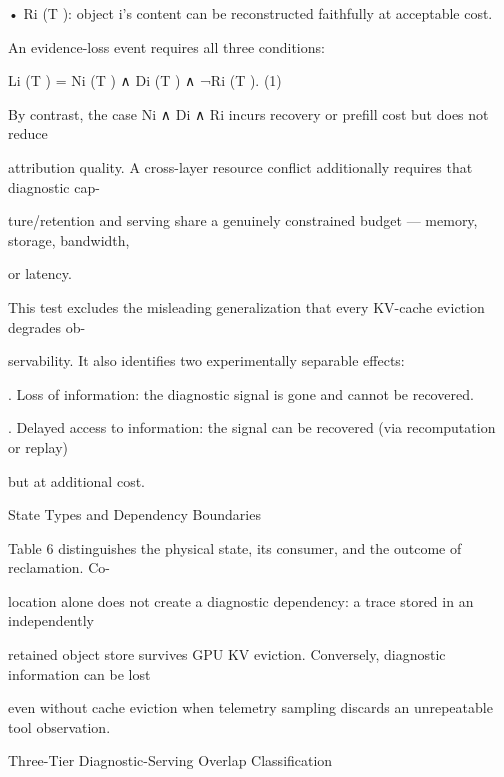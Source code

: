 \begin{flushleft}
\par\smallskip
\par\smallskip
\noindent  • Ri (T ): object i’s content can be reconstructed faithfully at acceptable cost.\par
\noindent  An evidence-loss event requires all three conditions:\par
\par\smallskip
\noindent  Li (T ) = Ni (T ) ∧ Di (T ) ∧ ¬Ri (T ). (1)\par
\par\smallskip
\noindent  By contrast, the case Ni ∧ Di ∧ Ri incurs recovery or prefill cost but does not reduce\par
\noindent attribution quality. A cross-layer resource conflict additionally requires that diagnostic cap-\par
\noindent ture/retention and serving share a genuinely constrained budget — memory, storage, bandwidth,\par
\noindent or latency.\par
\noindent  This test excludes the misleading generalization that every KV-cache eviction degrades ob-\par
\noindent servability. It also identifies two experimentally separable effects:\par
{}. Loss of information: the diagnostic signal is gone and cannot be recovered.\par
{}. Delayed access to information: the signal can be recovered (via recomputation or replay)\par
\noindent  but at additional cost.\par
\par\smallskip
{} State Types and Dependency Boundaries\par
\noindent Table 6 distinguishes the physical state, its consumer, and the outcome of reclamation. Co-\par
\noindent location alone does not create a diagnostic dependency: a trace stored in an independently\par
\noindent retained object store survives GPU KV eviction. Conversely, diagnostic information can be lost\par
\noindent even without cache eviction when telemetry sampling discards an unrepeatable tool observation.\par
\par\smallskip
{} Three-Tier Diagnostic-Serving Overlap Classification\par

\end{flushleft}
